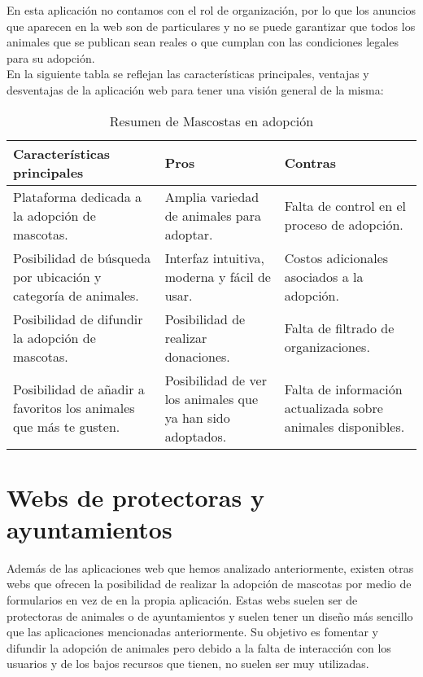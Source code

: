 En esta aplicación no contamos con el rol de organización, por lo que los anuncios que aparecen en la web son
de particulares y no se puede garantizar que todos los animales que se publican sean reales o que cumplan con las
condiciones legales para su adopción. \\

En la siguiente tabla se reflejan las características principales, ventajas y desventajas de la aplicación web
para tener una visión general de la misma: \\

\begin{table}[h]
\centering
\begin{tabular}{|p{6cm}|p{4cm}|p{4cm}|}
\hline
\textbf{Características principales} & \textbf{Pros} & \textbf{Contras} \\
\hline
Plataforma dedicada a la adopción de mascotas. &
Amplia variedad de animales para adoptar. &
Falta de control en el proceso de adopción. \\
\hline
Posibilidad de búsqueda por ubicación y categoría de animales. &
Interfaz intuitiva, moderna y fácil de usar. &
Costos adicionales asociados a la adopción. \\
\hline
Posibilidad de difundir la adopción de mascotas. &
Posibilidad de realizar donaciones. &
Falta de filtrado de organizaciones. \\
\hline
Posibilidad de añadir a favoritos los animales que más te gusten. &
Posibilidad de ver los animales que ya han sido adoptados. &
Falta de información actualizada sobre animales disponibles. \\
\hline
\end{tabular}
\caption{Resumen de Mascostas en adopción}
\label{tab:mascotas-adopcion}
\end{table}

\section{Webs de protectoras y ayuntamientos}\label{sec:protectoras-ayuntamientos}

Además de las aplicaciones web que hemos analizado anteriormente, existen otras webs que ofrecen la posibilidad
de realizar la adopción de mascotas por medio de formularios en vez de en la propia aplicación. Estas webs
suelen ser de protectoras de animales o de ayuntamientos y suelen tener un diseño más sencillo que las aplicaciones
mencionadas anteriormente. Su objetivo es fomentar y difundir la adopción de animales pero debido a la falta de
interacción con los usuarios y de los bajos recursos que tienen, no suelen ser muy utilizadas. \\

